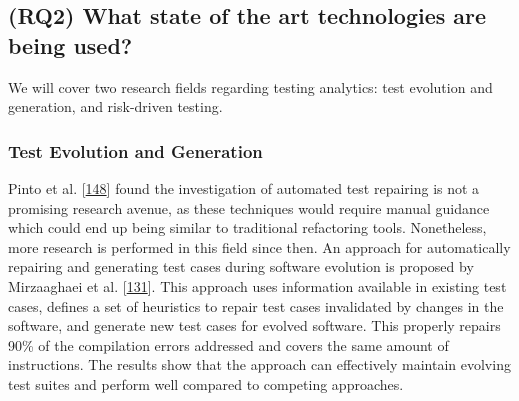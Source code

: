 \documentclass[]{book}
\begin{document}
\subsection{(RQ2) What state of the art technologies are being
used?}\label{rq2-what-state-of-the-art-technologies-are-being-used}

We will cover two research fields regarding testing analytics: test
evolution and generation, and risk-driven testing.

\subsubsection{Test Evolution and
Generation}\label{test-evolution-and-generation}

Pinto et al. {[}\protect\hyperlink{ref-pinto2012understanding}{148}{]}
found the investigation of automated test repairing is not a promising
research avenue, as these techniques would require manual guidance which
could end up being similar to traditional refactoring tools.
Nonetheless, more research is performed in this field since then. An
approach for automatically repairing and generating test cases during
software evolution is proposed by Mirzaaghaei et al.
{[}\protect\hyperlink{ref-supportingtestsuite}{131}{]}. This approach
uses information available in existing test cases, defines a set of
heuristics to repair test cases invalidated by changes in the software,
and generate new test cases for evolved software. This properly repairs
90\% of the compilation errors addressed and covers the same amount of
instructions. The results show that the approach can effectively
maintain evolving test suites and perform well compared to competing
approaches.
\end{document}
